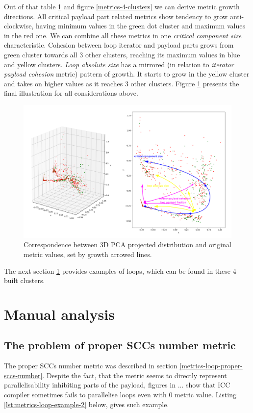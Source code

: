 \null\qquad Out of that table \ref{clusters-metric-values} and figure \ref{metrics-4-clusters} we can derive metric growth directions. All critical payload part related metrics show tendency to grow anti-clockwise, having minimum values in the green dot cluster and maximum values in the red one. We can combine all these metrics in one \textit{critical component size} characteristic. Cohesion between loop iterator and payload parts grows from green cluster towards all 3 other clusters, reaching its maximum values in blue and yellow clusters. \textit{Loop absolute size} has a mirrored (in relation to \textit{iterator payload cohesion} metric) pattern of growth. It starts to grow in the yellow cluster and takes on higher values as it reaches 3 other clusters. Figure \ref{clusters-metric-values} presents the final illustration for all considerations above.\newline   
\begin{figure}[htb]
\centering
\includegraphics[width=\linewidth]{figs/metrics-growth-directions.png}
\caption{Correspondence between 3D PCA projected distribution and original metric values, set by growth arrowed lines.}
\label{clusters-metric-values}
\end{figure}\newline
\null\qquad The next section \ref{analysis-manual-analysis} provides examples of loops, which can be found in these 4 built clusters.  

\section{Manual analysis}
\label{analysis-manual-analysis}

\subsection{The problem of proper SCCs number metric}
\qquad The proper SCCs number metric was described in section \ref{metrics-loop-proper-sccs-number}. Despite the fact, that the metric seems to directly represent parallelisability inhibiting parts of the payload, figures in ... show that ICC compiler sometimes fails to parallelise loops even with 0 metric value. Listing \ref{lst:metrics-loop-example-2} below, gives such example.


